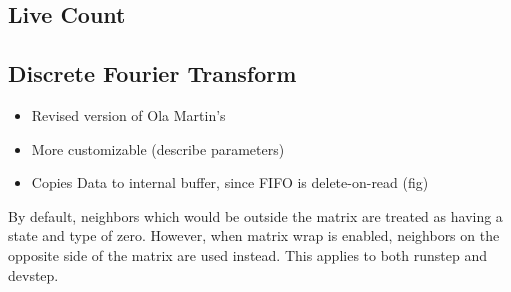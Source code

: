 \subsection{Live Count}


\subsection{Discrete Fourier Transform}

\begin{itemize}
    \item Revised version of Ola Martin's
    \item More customizable (describe parameters)
    \item Copies Data to internal buffer, since FIFO is delete-on-read (fig)
\end{itemize}

By default, neighbors which would be outside the matrix are treated as having a state and type of zero.
However, when matrix wrap is enabled, neighbors on the opposite side of the matrix are used instead.
This applies to both runstep and devstep.
